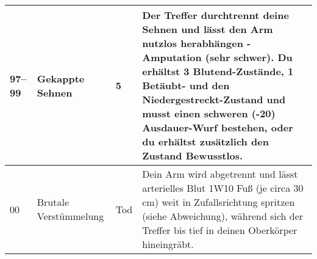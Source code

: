 \documentclass[a4paper, fontsize=8.5pt]{scrartcl}
\begin{document}
\begin{table}[!ht]
\begin{tabularx}{\textwidth}{lp{2.5cm}lX}
        97–99         & Gekappte Sehnen            & 5           & Der Treffer durchtrennt deine Sehnen und lässt den Arm nutzlos herabhängen - Amputation (sehr schwer). Du erhältst 3 Blutend-Zustände, 1 Betäubt- und den Niedergestreckt-Zustand und musst einen schweren (-20) Ausdauer-Wurf bestehen, oder du erhältst zusätzlich den Zustand Bewusstlos.                                                                                                                                                                                                                                                                                                                                                               \\ \hline
        00            & Brutale Verstümmelung      & Tod         & Dein Arm wird abgetrennt und lässt arterielles Blut 1W10 Fuß (je circa 30 cm) weit in Zufallsrichtung spritzen (siehe Abweichung), während sich der Treffer bis tief in deinen Oberkörper hineingräbt.                                                                                                                                                                                                                                                                                                                                                                                                                                                     \\
    \end{tabularx}
\end{table}
\pagebreak
\end{document}
